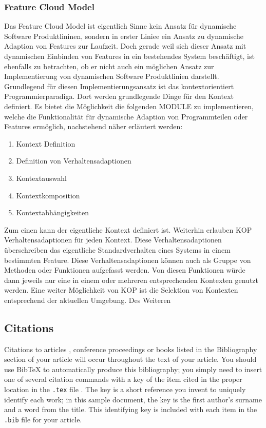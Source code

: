 \documentclass{sig-alternate-05-2015}
\begin{document}
\subsubsection{Feature Cloud Model}
Das Feature Cloud Model ist eigentlich Sinne kein Ansatz für dynamische Software Produktlininen, sondern in erster Liniee ein Ansatz zu dynamische Adaption von Features zur Laufzeit. 
Doch gerade weil sich dieser Ansatz mit dynamischen Einbinden von Features in ein bestehendes System beschäftigt, ist ebenfalls zu betrachten, ob er nicht auch ein möglichen Ansatz zur Implementierung von dynamischen Software Produktlinien darstellt.\\ 
Grundlegend für diesen Implementierungsansatz ist das kontextorientiert Programmierparadiga. 
Dort werden grundlegende Dinge für den Kontext definiert. 
Es bietet die Möglichkeit die folgenden  MODULE zu implementieren, welche die Funktionalität für dynamische Adaption von Programmteilen oder Features ermöglich, nachstehend näher erläutert werden: \\
\begin{enumerate}
	\item Kontext Definition
	\item	Definition von Verhaltensadaptionen
	\item	Kontextauswahl
	\item	Kontextkomposition
	\item	Kontextabhängigkeiten
\end{enumerate}
Zum einen kann der eigentliche Kontext definiert ist. 
Weiterhin erlauben KOP Verhaltensadaptionen für jeden Kontext. 
Diese Verhaltensadaptionen überschreiben das eigentliche Standardverhalten eines Systems in einem bestimmten Feature.  
Diese Verhaltensadaptionen können auch als Gruppe von Methoden oder Funktionen aufgefasst werden. 
Von diesen Funktionen würde dann jeweils nur eine in einem oder mehreren entsprechenden Kontexten genutzt werden. 
Eine weiter Möglichkeit von KOP ist die Selektion von Kontexten entsprechend der aktuellen Umgebung. 
Des Weiteren 



\subsection{Citations}
Citations to articles \cite{bowman:reasoning,
clark:pct, braams:babel, herlihy:methodology},
conference proceedings \cite{clark:pct} or
books \cite{salas:calculus, Lamport:LaTeX} listed
in the Bibliography section of your
article will occur throughout the text of your article.
You should use BibTeX to automatically produce this bibliography;
you simply need to insert one of several citation commands with
a key of the item cited in the proper location in
the \texttt{.tex} file \cite{Lamport:LaTeX}.
The key is a short reference you invent to uniquely
identify each work; in this sample document, the key is
the first author's surname and a
word from the title.  This identifying key is included
with each item in the \texttt{.bib} file for your article.
\end{document}
